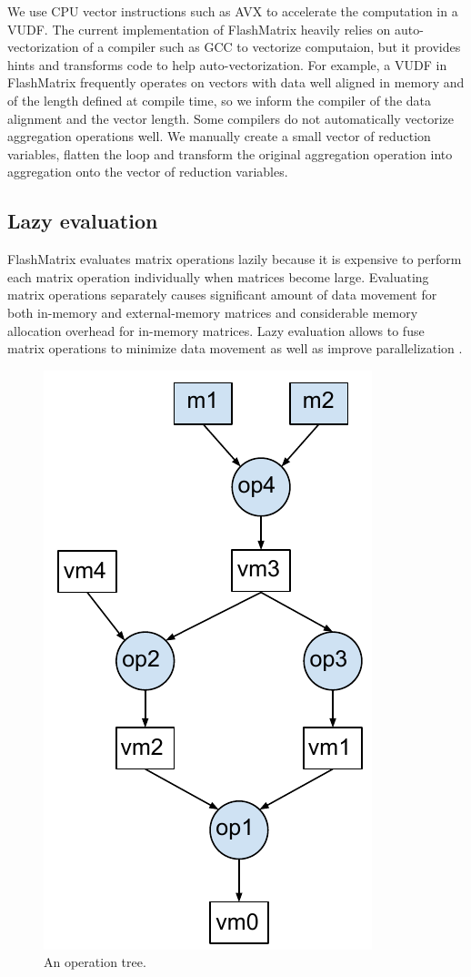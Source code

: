 We use CPU vector instructions such as AVX \cite{avx} to accelerate
the computation in a VUDF. The current implementation of FlashMatrix heavily
relies on auto-vectorization
of a compiler such as GCC to vectorize computaion, but it provides hints and
transforms code to help auto-vectorization. For example, a VUDF in FlashMatrix
frequently operates on vectors with data well aligned in memory and of
the length defined at compile time, so we inform the compiler of the data alignment
and the vector length. Some compilers do not automatically vectorize
aggregation operations well. We manually create a small vector of reduction
variables, flatten the loop and transform the original aggregation operation
into aggregation onto the vector of reduction variables.

\subsection{Lazy evaluation} \label{sec:lazy_eval}
FlashMatrix evaluates matrix operations lazily because it is expensive to
perform each matrix operation individually when matrices become large.
Evaluating matrix operations separately causes significant amount of data
movement for both in-memory and external-memory matrices and considerable
memory allocation overhead for in-memory matrices. Lazy evaluation allows
to fuse matrix operations to minimize data movement as well as improve
parallelization \cite{Ching12}.

\begin{figure}
	\centering
	\includegraphics[scale=0.5]{./DAG.pdf}
	\caption{An operation tree.}
	\label{fig:DAG}
\end{figure}

